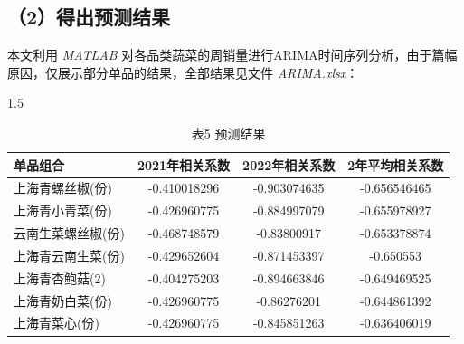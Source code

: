 \documentclass{article}
\begin{document}
	\subsection*{（2）得出预测结果}
	
	本文利用 \textit{MATLAB} 对各品类蔬菜的周销量进行ARIMA时间序列分析，由于篇幅原因，仅展示部分单品的结果，全部结果见文件 \textit{ARIMA.xlsx}：
	
	\begin{table}[h]
		\centering
		\caption*{表5 预测结果}
		\renewcommand{\heavyrulewidth}{1.2pt}
		\begin{spacing}{1.5} %
			\begin{tabular}{@{}lccc@{}}
				\toprule
				\textbf{单品组合} & \textbf{2021年相关系数} & \textbf{2022年相关系数} & \textbf{2年平均相关系数} \\
				\midrule
				上海青螺丝椒(份) & -0.410018296 & -0.903074635 & -0.656546465 \\
				上海青小青菜(份) & -0.426960775 & -0.884997079 & -0.655978927 \\
				云南生菜螺丝椒(份) & -0.468748579 & -0.83800917 & -0.653378874 \\
				上海青云南生菜(份) & -0.429652604 & -0.871453397 & -0.650553 \\
				上海青杏鲍菇(2) & -0.404275203 & -0.894663846 & -0.649469525 \\
				上海青奶白菜(份) & -0.426960775 & -0.86276201 & -0.644861392 \\
				上海青菜心(份) & -0.426960775 & -0.845851263 & -0.636406019 \\
				\bottomrule
			\end{tabular}
		\end{spacing}
	\end{table}
	\renewcommand{\heavyrulewidth}{0.8pt}
\end{document}
